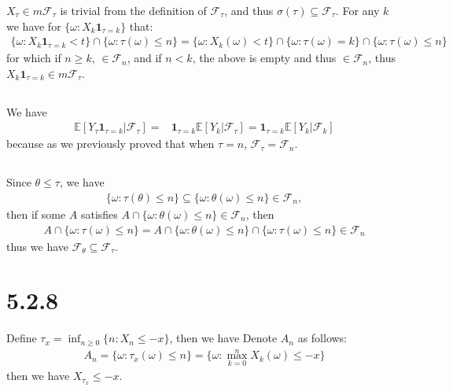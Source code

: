 \documentclass[11pt,a4paper]{ctexart}
\numberwithin{equation}{section}%
\newcommand{\F}{\mathcal{F}}
\begin{document}
$ X_\tau \in m\F_\tau $ is trivial from the definition of $ \F_\tau $, and thus $ \sigma (\tau)\subseteq \F_\tau $. For any $ k $ we have for $ \{\omega : X_k\mathbf{1}_{\tau = k} \}$ that: 
\begin{align*}
     \{\omega : X_k\mathbf{1}_{\tau = k} <t \} \cap \{\omega : \tau(\omega )\leq n\} = \{\omega : X_k(\omega ) < t \} \cap \{\omega : \tau(\omega ) = k\} \cap \{\omega : \tau(\omega )\leq n\} 
\end{align*}
for which if $ n\geq k $, $ \in \F_n $, and if $ n<k $, the above is empty and thus $ \in \F_n $, thus $ X_k\mathbf{1}_{\tau = k} \in m\F_\tau $.


\subsection{}

We have
\begin{align*}
    \mathbb{E}\left[ Y_\tau \mathbf{1}_{\tau =k}|\F_\tau \right] = & \mathbf{1}_{\tau = k}\mathbb{E}\left[ Y_k | \F_\tau \right] = \mathbf{1}_{\tau = k}\mathbb{E}\left[ Y_k | \F_k \right]  
\end{align*}
because as we previously proved that when $ \tau = n $, $ \F_\tau = \F_n $.


\subsection{}

Since $ \theta \leq\tau $, we have
\begin{align*}
    \{\omega : \tau(\theta )\leq n\} \subseteq \{\omega : \theta (\omega )\leq n\} \in \F_n,
\end{align*}
then if some $ A $ satisfies $ A\cap \{\omega: \theta (\omega)\leq n \} \in \F_n $, then
\begin{align*}
    A\cap \{\omega: \tau (\omega)\leq n \} = A\cap \{\omega: \theta (\omega)\leq n \} \cap \{\omega: \tau (\omega)\leq n \} \in \F_n
\end{align*}
thus we have $ \F_\theta \subseteq \F_\tau $.


\section{5.2.8}

Define $ \tau_x=\inf_{n\geq 0}\{n:X_n\leq -x\} $, then we have
Denote $ A_n $ as follows:
\begin{align*}
    A_n = \{\omega : \tau_x(\omega )\leq n\} = \{\omega : \mathop{ \max }\limits_{k=0}^n X_k(\omega )\leq -x\}
\end{align*}
then we have $ X_{\tau_x}\leq -x $.
\end{document}
